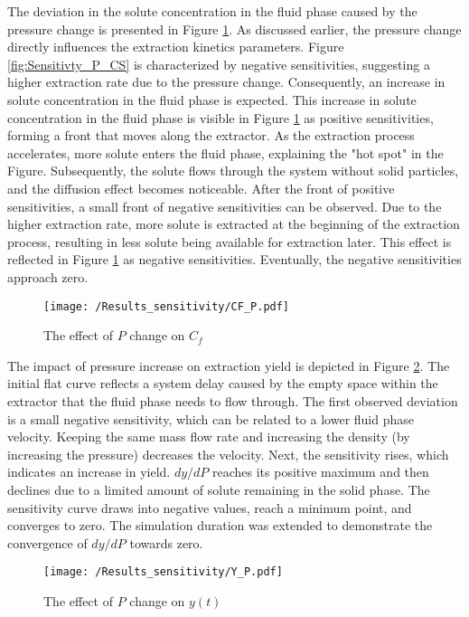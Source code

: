 \documentclass[../Article_Model_Parameters.tex]{subfiles}
\begin{document}
	The deviation in the solute concentration in the fluid phase caused by the pressure change is presented in Figure \ref{fig:Sensitivty_P_CF}. As discussed earlier, the pressure change directly influences the extraction kinetics parameters. Figure \ref{fig:Sensitivty_P_CS} is characterized by negative sensitivities, suggesting a higher extraction rate due to the pressure change. Consequently, an increase in solute concentration in the fluid phase is expected. This increase in solute concentration in the fluid phase is visible in Figure \ref{fig:Sensitivty_P_CF} as positive sensitivities, forming a front that moves along the extractor. As the extraction process accelerates, more solute enters the fluid phase, explaining the "hot spot" in the Figure. Subsequently, the solute flows through the system without solid particles, and the diffusion effect becomes noticeable. After the front of positive sensitivities, a small front of negative sensitivities can be observed. Due to the higher extraction rate, more solute is extracted at the beginning of the extraction process, resulting in less solute being available for extraction later. This effect is reflected in Figure \ref{fig:Sensitivty_P_CF} as negative sensitivities. Eventually, the negative sensitivities approach zero.

	\begin{figure}[h!]
		\centering
		\texttt{[image: /Results\_sensitivity/CF\_P.pdf]}
		\caption{The effect of $P$ change on $C_f$}
		\label{fig:Sensitivty_P_CF}
	\end{figure}

	The impact of pressure increase on extraction yield is depicted in Figure \ref{fig:Sensitivty_P_y}. The initial flat curve reflects a system delay caused by the empty space within the extractor that the fluid phase needs to flow through. The first observed deviation is a small negative sensitivity, which can be related to a lower fluid phase velocity. Keeping the same mass flow rate and increasing the density (by increasing the pressure) decreases the velocity. Next, the sensitivity rises, which indicates an increase in yield. $dy / dP$ reaches its positive maximum and then declines due to a limited amount of solute remaining in the solid phase. The sensitivity curve draws into negative values, reach a minimum point, and converges to zero. The simulation duration was extended to demonstrate the convergence of $dy / dP$ towards zero.

	\begin{figure}[h!]
		\centering
		\texttt{[image: /Results\_sensitivity/Y\_P.pdf]}
		\caption{The effect of $P$ change on $y(t)$}
		\label{fig:Sensitivty_P_y}
	\end{figure}
\end{document}
